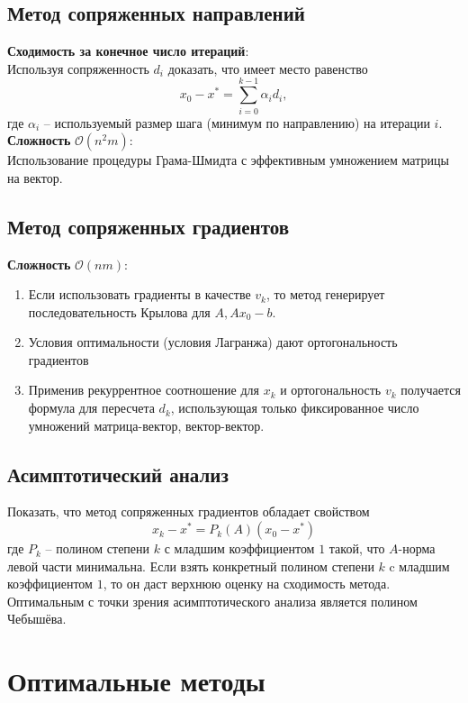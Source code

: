 \documentclass[10pt,a4paper]{article}
\begin{document}
\subsection{Метод сопряженных направлений}
\textbf{Сходимость за конечное число итераций}:\\
Используя сопряженность $d_i$ доказать, что имеет место равенство
$$
x_0-x^*=\sum_{i=0}^{k-1}\alpha_id_i,
$$
где $\alpha_i$ -- используемый размер шага (минимум по направлению) на итерации $i$.\\
\vspace{1em}
\textbf{Сложность} $\mathcal{O}(n^2m)$:\\
Использование процедуры Грама-Шмидта с эффективным умножением матрицы на вектор.

\subsection{Метод сопряженных градиентов}
\textbf{Сложность} $\mathcal{O}(nm)$:\\
\begin{enumerate}
\item Если использовать градиенты в качестве $v_k$, то метод генерирует последовательность Крылова для $A, Ax_0-b$.
\item Условия оптимальности (условия Лагранжа) дают ортогональность градиентов
\item Применив рекуррентное соотношение для $x_k$ и ортогональность $v_k$ получается формула для пересчета $d_k$, использующая только фиксированное число умножений матрица-вектор, вектор-вектор.
\end{enumerate}

\subsection{Асимптотический анализ}
Показать, что метод сопряженных градиентов обладает свойством
$$
x_k-x^*=P_k(A)(x_0-x^*)
$$
где $P_k$ -- полином степени $k$ с младшим коэффициентом $1$ такой, что $A$-норма левой части минимальна. Если взять конкретный полином степени $k$ c младшим коэффициентом $1$, то он даст верхнюю оценку на сходимость метода. Оптимальным с точки зрения асимптотического анализа является полином Чебышёва.

\section{Оптимальные методы}
\end{document}
